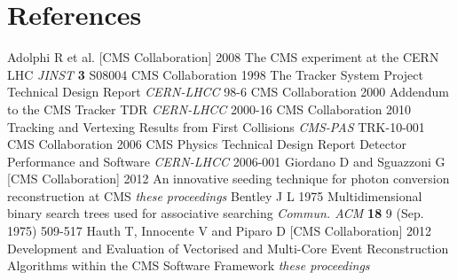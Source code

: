 \section*{References}

\begin{thebibliography}{99}
  Adolphi R et al. [CMS Collaboration] 2008 The CMS experiment at the CERN LHC
  {\em JINST} {\bf 3} S08004 
 CMS Collaboration 1998 The Tracker System Project Technical Design Report
  {\em CERN-LHCC} 98-6
 CMS Collaboration 2000 Addendum to the CMS Tracker TDR {\em
   CERN-LHCC} 2000-16
 CMS Collaboration 2010 Tracking and Vertexing Results from First Collisions
{\em CMS-PAS} TRK-10-001
 CMS Collaboration 2006 CMS Physics Technical Design
    Report Detector Performance and Software {\em
      CERN-LHCC} 2006-001
 Giordano D and Sguazzoni G [CMS
  Collaboration] 2012 An innovative seeding technique for photon conversion
  reconstruction at CMS {\em these proceedings}
 Bentley J L 1975 Multidimensional binary search
    trees used for associative searching {\em Commun. ACM} {\bf 18} 9 (Sep. 1975) 509-517 
 Hauth T, Innocente V and Piparo D [CMS
  Collaboration] 2012 Development and Evaluation of Vectorised and
    Multi-Core Event Reconstruction Algorithms within the CMS Software
    Framework {\em these proceedings}
\end{thebibliography}
